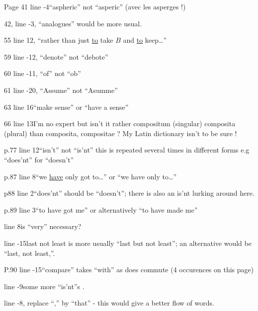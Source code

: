 Page 41 \unsure{-}line -4\quad ``aspheric'' not ``asperic'' (avec\unsure{,|-} les asperges !)

42, line -3, ``analogues'' would be more usual.

55 line 12, ``rather than just \uline{to} take $B$ and \uline{to} keep\ldots''

59 line -12, ``denote'' not ``debote''

60 line -11, ``of'' not ``ob''

61 line -20, ``Assume'' not ``Asumme''

63 line 16\quad ``make sense'' or ``have a sense''

66 line 13\quad I'm no  expert but isn't it rather compositum (singular) composita (plural) than composita, compositae ? My Latin dictionary isn't  to be sure !

p.77 line 12\quad ``isn't'' not ``is'nt'' this is repeated several times in different forms e.g ``does'nt'' for ``doesn't''

p.87 line 8\quad ``we \uline{have} only got to\ldots'' or ``we have only to\ldots''

p88 line 2\quad ``does'nt'' should be ``doesn't''; there is also an is'nt lurking around here.

p.89 line 3\quad ``to have got me'' or alternatively ``to have made me''

line 8\quad is ``very'' necessary?

line -15\quad {}last not least is more usually ``last but not least''; an alternative would be ``last, not least,''.

P.90 line -15\quad ``compare'' takes ``with'' as does commute (4 occurences on this page)

line -9\quad some more ``is'nt''s .

line -8, replace ``,'' by ``that'' - this would give a better flow of words.

